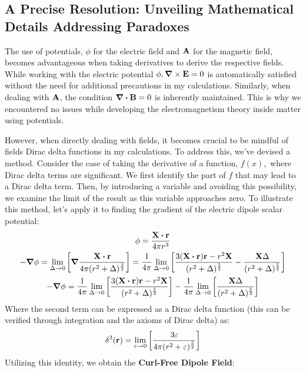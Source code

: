 \documentclass{article}
\numberwithin{equation}{section}
\begin{document}
\subsection{A Precise Resolution: Unveiling Mathematical Details Addressing Paradoxes}
The use of potentials, $\phi$ for the electric field and $\vb{A}$ for the magnetic field, becomes advantageous when taking derivatives to derive the respective fields. While working with the electric potential $\phi, \grad \times \vb{E} = 0$ is automatically satisfied without the need for additional precautions in my calculations. Similarly, when dealing with $\vb{A}$, the condition $\grad \vdot \vb{B} = 0$ is inherently maintained. This is why we encountered no issues while developing the electromagnetism theory inside matter using potentials.
\par
However, when directly dealing with fields, it becomes crucial to be mindful of fields Dirac delta functions in my calculations. To address this, we've devised a method. Consider the case of taking the derivative of a function, $f(x),$ where Dirac delta terms are significant. We first identify the part of $f$ that may lead to a Dirac delta term. Then, by introducing a variable and avoiding this possibility, we examine the limit of the result as this variable approaches zero. To illustrate this method, let's apply it to finding the gradient of the electric dipole scalar potential:
\begin{gather}
\phi=\frac{\vb{X}\vdot\vb{r}}{4\pi r^3}\nonumber\\-\grad\phi=\lim_{\Delta\rightarrow0}\left[\grad \frac{\vb{X}\vdot\vb{r}}{4\pi (r^2+\Delta)^\frac{3}{2}}\right]=\frac{1}{4\pi}\lim_{\Delta\rightarrow0}\left[ \frac{3(\vb{X}\vdot\vb{r})\vb{r}-r^2\vb{X}}{(r^2+\Delta)^\frac{5}{2}}-\frac{\vb{X}\Delta}{(r^2+\Delta)^\frac{5}{2}} \right]\nonumber\\-\grad\phi=\frac{1}{4\pi}\lim_{\Delta\rightarrow0}\left[ \frac{3(\vb{X}\vdot\vb{r})\vb{r}-r^2\vb{X}}{(r^2+\Delta)^\frac{5}{2}}\right]-\frac{1}{4\pi}\lim_{\Delta\rightarrow0}\left[\frac{\vb{X}\Delta}{(r^2+\Delta)^\frac{5}{2}} \right]\nonumber
\end{gather}
Where the second term can be expressed as a Dirac delta function (this can be verified through integration and the axioms of Dirac delta) as:
\begin{equation}
\delta^3(\vb{r})=\lim_{\varepsilon\rightarrow0}\left[ \frac{3\varepsilon}{4\pi(r^2+\varepsilon)^\frac{5}{2}}\right]\nonumber
\end{equation}
Utilizing this identity, we obtain the \textbf{Curl-Free Dipole Field}:
\end{document}
